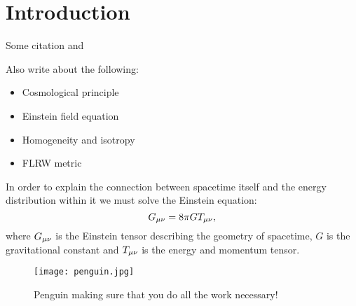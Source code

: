 \section{Introduction}\label{sec:introduction}

Some citation \cite{dodelson2020modern} and \cite{weinberg2008cosmology}

Also write about the following:

\begin{itemize}
    \item Cosmological principle
    \item Einstein field equation
    \item Homogeneity and isotropy
    \item FLRW metric 
\end{itemize}

In order to explain the connection between spacetime itself and the energy distribution within it we must solve the Einstein equation:
\begin{equation}\label{eq:introduction:einstein_equation}
    G_{\mu\nu} = 8\pi GT_{\mu\nu},
\end{equation}
where $G_{\mu\nu}$ is the Einstein tensor describing the geometry of spacetime, $G$ is the gravitational constant and $T_{\mu\nu}$ is the energy and momentum tensor.

\begin{figure}
    \texttt{[image: penguin.jpg]}
    \label{fig:penguin}
    \caption{Penguin making sure that you do all the work necessary!}
\end{figure}